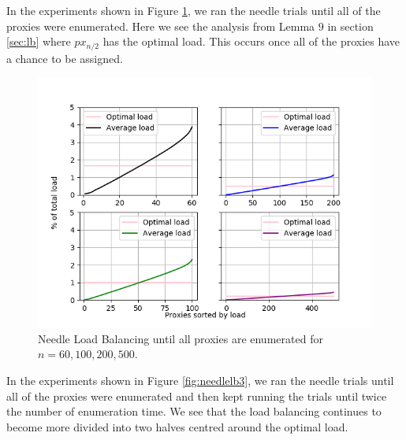 
In the experiments shown in Figure \ref{fig:needlelb2}, we ran the needle trials until all of the proxies were enumerated. Here we see the analysis from Lemma $9$ in section \ref{sec:lb} where $px_{n/2}$ has the optimal load. This occurs once all of the proxies have a chance to be assigned. 


\begin{figure}[h!]
\centering
     \includegraphics[width=1.0\textwidth]{fig/load_balance_needle_to_enum_60_100_200_500.png}
    \caption{Needle Load Balancing until all proxies are enumerated for $n=60, 100, 200, 500$.}

    \label{fig:needlelb2}
\end{figure}


In the experiments shown in Figure \ref{fig:needlelb3}, we ran the needle trials until all of the proxies were enumerated and then kept running the trials until twice the number of enumeration time. We see that the load balancing continues to become more divided into two halves centred around the optimal load.

